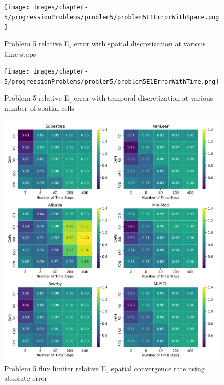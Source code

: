 \clearpage

\begin{figure}[p]
    \centering
    \texttt{[image: images/chapter-5/progressionProblems/problem5/problem5E1ErrorWithSpace.png]}
    \caption{Problem 5 relative E${}_{1}$ error with spatial discretization at various time steps}
    \label{fig:problem5_l1error_spatial_results}
\end{figure}

\clearpage

\begin{figure}[p]
    \centering
    \texttt{[image: images/chapter-5/progressionProblems/problem5/problem5E1ErrorWithTime.png]}
    \caption{Problem 5 relative E${}_{1}$ error with temporal discretization at various number of spatial cells}
    \label{fig:problem5_l1error_time_results}
\end{figure}

\clearpage

\begin{figure}[p]
    \centering
    \includegraphics[width=6in]{images/chapter-5/progressionProblems/problem5/problem5E1FluxLimiterConvergenceRate.png}
    \caption{Problem 5 flux limiter relative E${}_{1}$ spatial convergence rate using absolute error}
    \label{fig:problem5_l1error_fluxlimiter_convergence_rate}
\end{figure}

